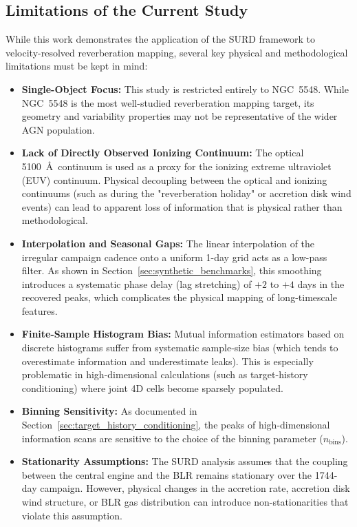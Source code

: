 \documentclass[fleqn,usenatbib]{mnras}
\begin{document}
\subsection{Limitations of the Current Study}
\label{sec:limitations}

While this work demonstrates the application of the SURD framework to velocity-resolved reverberation mapping, several key physical and methodological limitations must be kept in mind:
\begin{itemize}
\item \textbf{Single-Object Focus:} This study is restricted entirely to NGC~5548. While NGC~5548 is the most well-studied reverberation mapping target, its geometry and variability properties may not be representative of the wider AGN population.
\item \textbf{Lack of Directly Observed Ionizing Continuum:} The optical 5100~\AA\ continuum is used as a proxy for the ionizing extreme ultraviolet (EUV) continuum. Physical decoupling between the optical and ionizing continuums (such as during the "reverberation holiday" or accretion disk wind events) can lead to apparent loss of information that is physical rather than methodological.
\item \textbf{Interpolation and Seasonal Gaps:} The linear interpolation of the irregular campaign cadence onto a uniform 1-day grid acts as a low-pass filter. As shown in Section~\ref{sec:synthetic_benchmarks}, this smoothing introduces a systematic phase delay (lag stretching) of $+2$ to $+4$ days in the recovered peaks, which complicates the physical mapping of long-timescale features.
\item \textbf{Finite-Sample Histogram Bias:} Mutual information estimators based on discrete histograms suffer from systematic sample-size bias (which tends to overestimate information and underestimate leaks). This is especially problematic in high-dimensional calculations (such as target-history conditioning) where joint 4D cells become sparsely populated.
\item \textbf{Binning Sensitivity:} As documented in Section~\ref{sec:target_history_conditioning}, the peaks of high-dimensional information scans are sensitive to the choice of the binning parameter ($n_{\mathrm{bins}}$).
\item \textbf{Stationarity Assumptions:} The SURD analysis assumes that the coupling between the central engine and the BLR remains stationary over the 1744-day campaign. However, physical changes in the accretion rate, accretion disk wind structure, or BLR gas distribution can introduce non-stationarities that violate this assumption.
\end{itemize}
\end{document}
